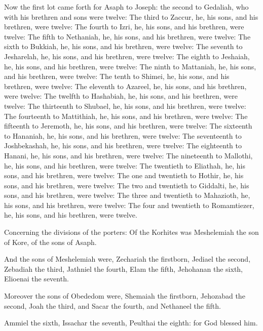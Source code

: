 \Verse Now the first lot came forth for Asaph to Joseph: the second to Gedaliah, who with his brethren and sons were twelve: \Verse The third to Zaccur, he, his sons, and his brethren, were twelve: \Verse The fourth to Izri, he, his sons, and his brethren, were twelve: \Verse The fifth to Nethaniah, he, his sons, and his brethren, were twelve: \Verse The sixth to Bukkiah, he, his sons, and his brethren, were twelve: \Verse The seventh to Jesharelah, he, his sons, and his brethren, were twelve: \Verse The eighth to Jeshaiah, he, his sons, and his brethren, were twelve: \Verse The ninth to Mattaniah, he, his sons, and his brethren, were twelve: \Verse The tenth to Shimei, he, his sons, and his brethren, were twelve: \Verse The eleventh to Azareel, he, his sons, and his brethren, were twelve: \Verse The twelfth to Hashabiah, he, his sons, and his brethren, were twelve: \Verse The thirteenth to Shubael, he, his sons, and his brethren, were twelve: \Verse The fourteenth to Mattithiah, he, his sons, and his brethren, were twelve: \Verse The fifteenth to Jeremoth, he, his sons, and his brethren, were twelve: \Verse The sixteenth to Hananiah, he, his sons, and his brethren, were twelve: \Verse The seventeenth to Joshbekashah, he, his sons, and his brethren, were twelve: \Verse The eighteenth to Hanani, he, his sons, and his brethren, were twelve: \Verse The nineteenth to Mallothi, he, his sons, and his brethren, were twelve: \Verse The twentieth to Eliathah, he, his sons, and his brethren, were twelve: \Verse The one and twentieth to Hothir, he, his sons, and his brethren, were twelve: \Verse The two and twentieth to Giddalti, he, his sons, and his brethren, were twelve: \Verse The three and twentieth to Mahazioth, he, his sons, and his brethren, were twelve: \Verse The four and twentieth to Romamtiezer, he, his sons, and his brethren, were twelve.


\Chapter
\Verse Concerning the divisions of the porters: Of the Korhites was Meshelemiah the son of Kore, of the sons of Asaph.

\Verse And the sons of Meshelemiah were, Zechariah the firstborn, Jediael the second, Zebadiah the third, Jathniel the fourth, \Verse Elam the fifth, Jehohanan the sixth, Elioenai the seventh.

\Verse Moreover the sons of Obededom were, Shemaiah the firstborn, Jehozabad the second, Joah the third, and Sacar the fourth, and Nethaneel the fifth.

\Verse Ammiel the sixth, Issachar the seventh, Peulthai the eighth: for God blessed him.

